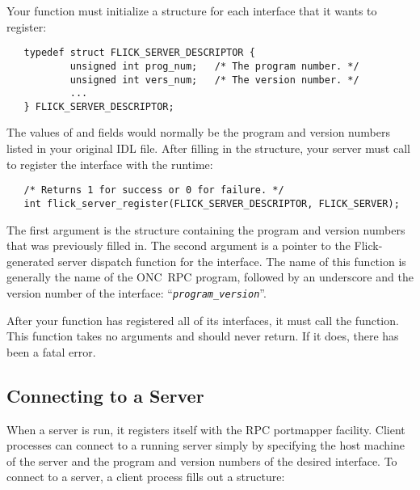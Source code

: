Your  function must initialize a
 structure for each interface that it wants to
register:

\begin{verbatim}
   typedef struct FLICK_SERVER_DESCRIPTOR {
           unsigned int prog_num;   /* The program number. */
           unsigned int vers_num;   /* The version number. */
           ...
   } FLICK_SERVER_DESCRIPTOR;
\end{verbatim}

\noindent The values of  and 
fields would normally be the program and version numbers listed in your
original IDL file.  After filling in the 
structure, your server must call  to register
the interface with the runtime:

\begin{verbatim}
   /* Returns 1 for success or 0 for failure. */
   int flick_server_register(FLICK_SERVER_DESCRIPTOR, FLICK_SERVER);
\end{verbatim}

\noindent The first argument is the structure containing the program and
version numbers that was previously filled in.  The second argument is a
pointer to the Flick-generated server dispatch function for the interface.  The
name of this function is generally the name of the ONC~RPC program, followed by
an underscore and the version number of the interface:
``\texttt{\emph{program}\_\emph{version}}''.

After your  function has registered all of its interfaces, it
must call the  function.  This function takes no
arguments and should never return.  If it does, there has been a fatal error.



\subsection{Connecting to a Server}
\label{subsec:Connecting to a Server}

When a server is run, it registers itself with the RPC portmapper facility.
Client processes can connect to a running server simply by specifying the host
machine of the server and the program and version numbers of the desired
interface.  To connect to a server, a client process fills out a
 structure:


